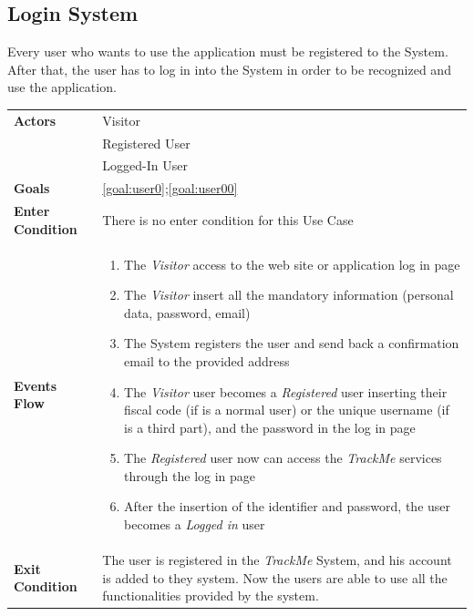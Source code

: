   \subsection{Login System}
Every user who wants to use the application must be registered to the System.
After that, the user has to log in into the System in order to be recognized and use the application.

\begin{table}[H]
	\centering
    
    \begin{tabular}{|p{3.5cm}|p{10.3cm}|}
    
    \hline
    \textbf{\large{Actors}}  			& \tabitem Visitor 									\\
    				 					& \tabitem Registered User							\\
                     					& \tabitem Logged-In User 							\\
    \hline
    \textbf{\large{Goals}} 				& \ref{goal:user0};\ref{goal:user00}\\
    
    \hline
    \textbf{\large{Enter Condition}}	& There is no enter condition for this Use Case		\\
    
    \hline
    \textbf{\large{Events Flow}}		& \begin{enumerate}[leftmargin=0.5cm]
                                          	\item The \emph{Visitor}  access to the web site or application log in page
                                            \item The \emph{Visitor} insert all the mandatory information (personal data, password, email)
                                            \item The System registers the user and send back a confirmation email to the provided address
                                            \item The \emph{Visitor} user becomes a \emph{Registered} user inserting their fiscal code (if is a normal user) or the unique username (if is a third part), and the password in the log in page   
                                            \item The \emph{Registered} user now can access the \emph{TrackMe} services through the log in page
                                            
                                            \item After the insertion of the identifier and password, the user becomes a \emph{Logged in} user
                                          \end{enumerate}
    										\\
    \hline
    \textbf{\large{Exit Condition}} 	& The user is registered in the \emph{TrackMe} System, and his account is added to they system. Now the users are able to use all the functionalities provided by the system. \\
    

\end{tabular}
\end{table}
